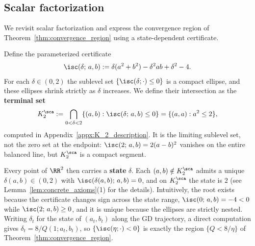 \documentclass{article}
\begin{document}
\subsection{Scalar factorization}\label{subsec:scalar_factorization}

We revisit scalar factorization and express the convergence region of
Theorem~\ref{thm:convergence_region} using a state-dependent certificate.

Define the parameterized certificate
\begin{align}
    \isc(\delta;\,a,b) := \delta(a^2 + b^2)  - \delta^2ab + \delta^2 - 4.
    \label{eq:I_delta}
\end{align}
For each $\delta\in(0,2)$ the sublevel set $\{\isc(\delta;\cdot)\le 0\}$ is a
compact ellipse, and these ellipses shrink strictly as $\delta$ increases.
We define their intersection as the \textbf{terminal set}
\begin{align}
    K_2^\sca
    :=
    \bigcap_{0<\delta<2}\{(a,b):\isc(\delta;\,a,b)\le 0\}
    =
    \{(a,a):a^2\le 2\},
    \label{eq:K2_scalar}
\end{align}
computed in Appendix~\ref{appx:K_2_description}. It is the limiting sublevel
set, not the zero set at the endpoint: $\isc(2;\,a,b)=2(a-b)^2$ vanishes on the
entire balanced line, but $K_2^\sca$ is a compact segment.

Every point of $\RR^2$ then carries a \textbf{state} $\delta$. Each $(a,b)\notin K_2^\sca$ admits a unique
$\delta(a,b)\in(0,2)$ with $\isc(\delta(a,b);\,a,b)=0$, and on $K_2^\sca$ the
state is $2$ (see Lemma~\ref{lem:concrete_axioms}(1) for the details).
Intuitively, the root exists because the certificate changes sign
across the state range, $\isc(0;\,a,b)=-4<0$ while $\isc(2;\,a,b)\ge0$, and it
is unique because the ellipses are strictly nested.
Writing $\delta_t$ for the state of $(a_t,b_t)$ along the GD trajectory, a
direct computation gives $\delta_t=8/Q(1;a_t,b_t)$, so $\{\isc(\eta;\cdot)<0\}$
is exactly the region $\{Q<8/\eta\}$ of
Theorem~\ref{thm:convergence_region}.
\end{document}
